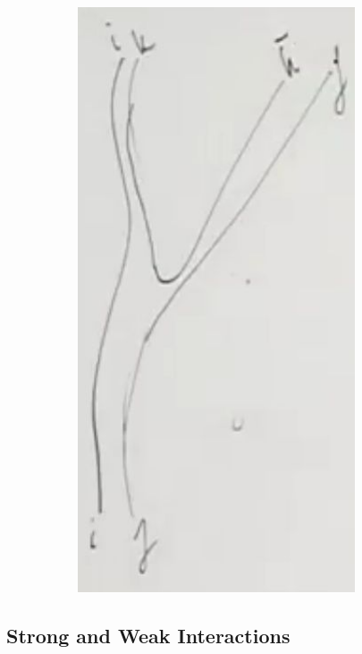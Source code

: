\documentclass[]{article}
\begin{document}
\begin{figure}[H]
\begin{subfigure}[t]{0.45\textwidth}
		\includegraphics[width=0.9\textwidth]{2-5-gluon-gluon}
	\end{subfigure}
\end{figure}

\subsection{Strong and Weak Interactions}
\end{document}
